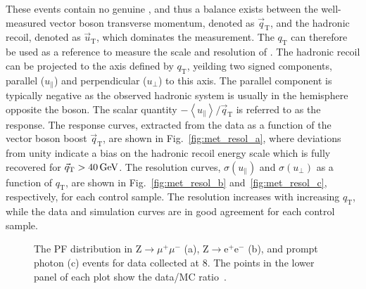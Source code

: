 These events contain no genuine \VEtmiss, and thus a balance exists between the well-measured vector boson transverse momentum, denoted as ${\vec q}_\mathrm{T}$, and the hadronic recoil, denoted as ${\vec u}_\mathrm{T}$,  which dominates the \VEtmiss measurement. The $q_\mathrm{T}$ can therefore be used as a reference to measure the scale and resolution of \VEtmiss.
The hadronic recoil can be projected to the axis defined by $q_\mathrm{T}$, yeilding two signed components, parallel ($u_\parallel$) and perpendicular ($u_\perp$) to this axis. The parallel component is typically negative as the observed hadronic system is usually in the hemisphere opposite the boson. The scalar quantity $-\left\langle u_\parallel\right\rangle/{\vec q}_\mathrm{T}$ is referred to as the \VEtmiss response. The response curves, extracted from the data as a function of the vector boson boost ${\vec q}_\mathrm{T}$, are shown in Fig.~\ref{fig:met_resol_a}, where deviations from unity indicate a bias on the hadronic recoil energy scale which is  fully recovered for ${\vec q}_\mathrm{T} > 40\,\text{Ge\hspace{-.08em}V}$.
The resolution curves, $\sigma(u_\parallel)$ and $\sigma(u_\perp)$ as a function of $q_\mathrm{T}$, are shown in Fig.~\ref{fig:met_resol_b} and~\ref{fig:met_resol_c}, respectively, for each control sample. The resolution increases with increasing $q_\mathrm{T}$, while the data and simulation curves are in good agreement for each control sample.\\

\begin{figure}[!htb]
\begin{center}
\end{center} 
\caption{The PF \ETmiss distribution in Z$\rightarrow\mu^+\mu^-$ (a), Z$\rightarrow$e$^+$e$^-$ (b), and prompt photon (c) events for data collected at 8\TeV. The points in the lower panel of each plot show the data/MC ratio~\cite{Khachatryan:2014gga}.}
\label{fig:met_distr}
\end{figure}

